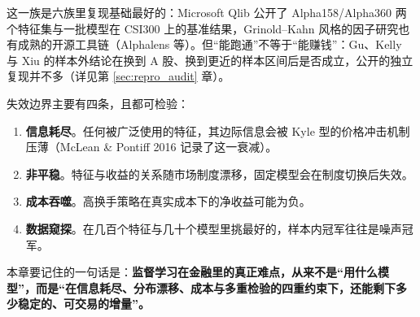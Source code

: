 这一族是六族里复现基础最好的：Microsoft Qlib\cite{qlib} 公开了 Alpha158/Alpha360 两个特征集与一批模型在 CSI300 上的基准结果，Grinold--Kahn 风格的因子研究也有成熟的开源工具链（Alphalens 等）。但“能跑通”不等于“能赚钱”：Gu、Kelly 与 Xiu 的样本外结论在换到 A 股、换到更近的样本区间后是否成立，公开的独立复现并不多（详见第 \ref{sec:repro_audit} 章）。

失效边界主要有四条，且都可检验：

\begin{enumerate}
  \item \textbf{信息耗尽}。任何被广泛使用的特征，其边际信息会被 Kyle 型的价格冲击机制压薄（McLean \& Pontiff 2016\cite{mcleanpontiff2016} 记录了这一衰减）。
  \item \textbf{非平稳}。特征与收益的关系随市场制度漂移，固定模型会在制度切换后失效。
  \item \textbf{成本吞噬}。高换手策略在真实成本下的净收益可能为负。
  \item \textbf{数据窥探}。在几百个特征与几十个模型里挑最好的，样本内冠军往往是噪声冠军。
\end{enumerate}

本章要记住的一句话是：\textbf{监督学习在金融里的真正难点，从来不是“用什么模型”，而是“在信息耗尽、分布漂移、成本与多重检验的四重约束下，还能剩下多少稳定的、可交易的增量”。}
